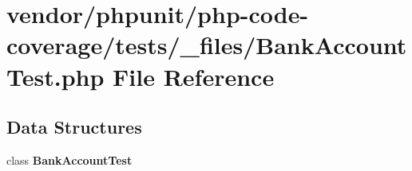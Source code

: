 \section{vendor/phpunit/php-\/code-\/coverage/tests/\+\_\+files/\+Bank\+Account\+Test.php File Reference}
\label{php-code-coverage_2tests_2__files_2_bank_account_test_8php}
\subsection*{Data Structures}
\begin{DoxyCompactItemize}
\item 
class {\bf Bank\+Account\+Test}
\end{DoxyCompactItemize}
